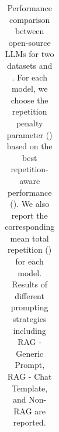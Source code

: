 \begin{table}[]
{\begin{tabular}{l|l|rrrr|rrrr|rrrr}
\end{tabular}}
\caption{Performance comparison between open-source LLMs for two datasets \webqsp and \ms. For each model, we choose the repetition penalty parameter (\rp) based on the best repetition-aware performance (\rap). We also report the corresponding mean total repetition (\mtr) for each model. Results of different prompting strategies including RAG - Generic Prompt, RAG - Chat Template, and Non-RAG are reported.}
\label{tab:best_rpp}
\end{table}